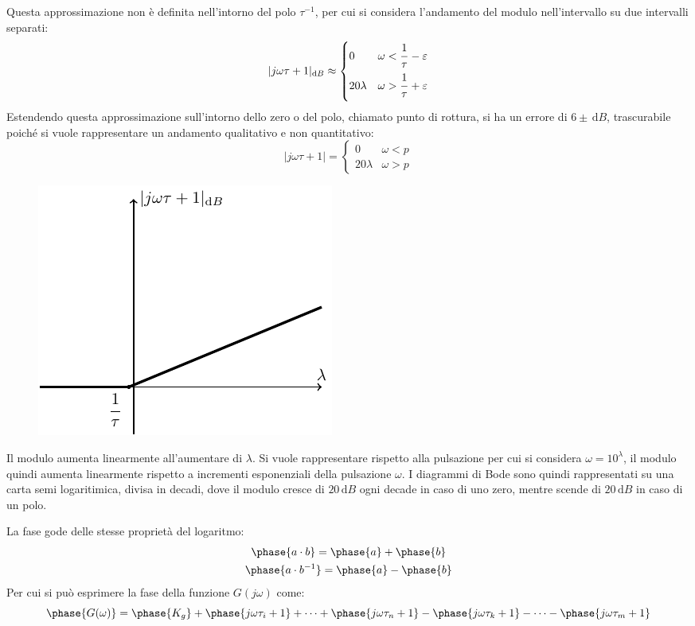 \documentclass{article}
\numberwithin{equation}{subsection}
\newcommand{\df}{\mathrm{d}}
\newcommand{\Frac}[2]{\displaystyle\frac{\strut{#1}}{\strut{#2}}}
\begin{document}
Questa approssimazione non è definita nell'intorno del polo 
$\tau^{-1}$, per cui si considera l'andamento del modulo nell'intervallo su due intervalli separati:
\begin{equation*}
    |j\omega\tau+1|_{\df B}\approx
    \begin{cases}
        0&\omega<\Frac{1}{\tau}-\varepsilon\\
        20\lambda&\omega>\Frac{1}{\tau}+\varepsilon
    \end{cases}
\end{equation*}
Estendendo questa approssimazione sull'intorno dello zero o del polo, chiamato punto di rottura, si ha un errore di $6\pm\,\df B$, trascurabile poiché si vuole rappresentare un 
andamento qualitativo e non quantitativo: 
\begin{equation}
    |j\omega\tau+1|=\begin{cases}
        0&\omega<p\\
        20\lambda&\omega>p
    \end{cases}
\end{equation}
\begin{figure}[H]%
    \centering
    \includegraphics{modulo-bode-2.pdf}%
\end{figure}
Il modulo aumenta linearmente all'aumentare di $\lambda$. Si vuole rappresentare rispetto alla pulsazione per cui si considera 
$\omega=10^{\lambda}$, il modulo quindi aumenta linearmente rispetto a incrementi esponenziali della pulsazione $\omega$. I diagrammi di Bode sono quindi rappresentati 
su una carta semi logaritimica, divisa in decadi, dove il modulo cresce di $20\,\df B$ ogni decade in caso di uno zero, mentre scende di $20\,\df B$ in caso di un polo. 

La fase gode delle stesse proprietà del logaritmo:
\begin{gather*}
    \phase{a\cdot b}=\phase{a}+\phase{b}\\
    \phase{a\cdot b^{-1}}=\phase{a}-\phase{b}
\end{gather*}
Per cui si può esprimere la fase della funzione $G(j\omega)$ come:
\begin{equation}
    \phase{G(\omega)}=\phase{K_g}+\phase{j\omega\tau_i+1}+\cdots+\phase{j\omega\tau_n+1}-\phase{j\omega\tau_k+1}-\cdots-\phase{j\omega\tau_m+1}
\end{equation}
\end{document}
